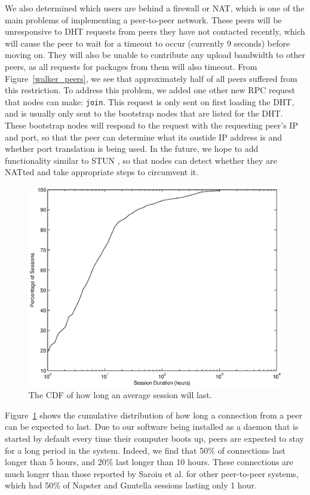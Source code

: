 \documentclass[conference]{IEEEtran}
\begin{document}
We also determined which users are
behind a firewall or NAT, which is one of the main problems of
implementing a peer-to-peer network. These peers will be
unresponsive to DHT requests from peers they have not contacted
recently, which will cause the peer to wait for a timeout to occur
(currently 9 seconds) before moving on. They will also be
unable to contribute any upload bandwidth to other peers, as all
requests for packages from them will also timeout. From
Figure~\ref{walker_peers}, we see that approximately half of all
peers suffered from this restriction. To address this problem, we added one other new RPC request that nodes can make:
\texttt{join}. This request is only sent on first loading the DHT,
and is usually only sent to the bootstrap nodes that are listed for
the DHT. These bootstrap nodes will respond to the request with the
requesting peer's IP and port, so that the peer can determine what
its oustide IP address is and whether port translation is being
used. In the future, we hope to add functionality similar to STUN
\cite{STUN}, so that nodes can detect whether they are NATted and
take appropriate steps to circumvent it.


\begin{figure}
\centering
\includegraphics[width=0.80\columnwidth]{AptP2PDuration-peers.eps}
\caption{The CDF of how long an average session will last.}
\label{duration_peers}
\end{figure}

Figure~\ref{duration_peers} shows the cumulative distribution of how
long a connection from a peer can be expected to last. Due to our
software being installed as a daemon that is started by default
every time their computer boots up, peers are expected to stay for a
long period in the system.
Indeed, we find that 50\% of connections last longer than 5
hours, and 20\% last longer than 10 hours. These connections are
much longer than those reported by Saroiu et al. \cite{saroiu2001}
for other peer-to-peer systems, which had 50\% of Napster and Gnutella
sessions lasting only 1 hour.
\end{document}
